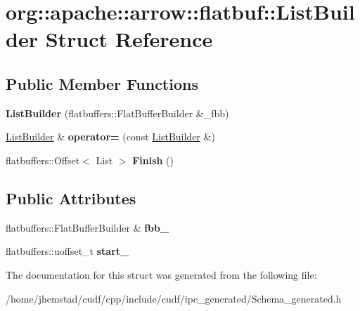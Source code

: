 \hypertarget{structorg_1_1apache_1_1arrow_1_1flatbuf_1_1ListBuilder}{}\section{org\+:\+:apache\+:\+:arrow\+:\+:flatbuf\+:\+:List\+Builder Struct Reference}
\label{structorg_1_1apache_1_1arrow_1_1flatbuf_1_1ListBuilder}
\subsection*{Public Member Functions}
\begin{DoxyCompactItemize}
\item 
{\bfseries List\+Builder} (flatbuffers\+::\+Flat\+Buffer\+Builder \&\+\_\+fbb)\hypertarget{structorg_1_1apache_1_1arrow_1_1flatbuf_1_1ListBuilder_a5aa3bbf4a737651d49a5c688754c3c94}{}\label{structorg_1_1apache_1_1arrow_1_1flatbuf_1_1ListBuilder_a5aa3bbf4a737651d49a5c688754c3c94}

\item 
\hyperlink{structorg_1_1apache_1_1arrow_1_1flatbuf_1_1ListBuilder}{List\+Builder} \& {\bfseries operator=} (const \hyperlink{structorg_1_1apache_1_1arrow_1_1flatbuf_1_1ListBuilder}{List\+Builder} \&)\hypertarget{structorg_1_1apache_1_1arrow_1_1flatbuf_1_1ListBuilder_acd18f75a87428486cea55e06c74a978c}{}\label{structorg_1_1apache_1_1arrow_1_1flatbuf_1_1ListBuilder_acd18f75a87428486cea55e06c74a978c}

\item 
flatbuffers\+::\+Offset$<$ List $>$ {\bfseries Finish} ()\hypertarget{structorg_1_1apache_1_1arrow_1_1flatbuf_1_1ListBuilder_ad236f7225ca8f8e629a3877b114d65dc}{}\label{structorg_1_1apache_1_1arrow_1_1flatbuf_1_1ListBuilder_ad236f7225ca8f8e629a3877b114d65dc}

\end{DoxyCompactItemize}
\subsection*{Public Attributes}
\begin{DoxyCompactItemize}
\item 
flatbuffers\+::\+Flat\+Buffer\+Builder \& {\bfseries fbb\+\_\+}\hypertarget{structorg_1_1apache_1_1arrow_1_1flatbuf_1_1ListBuilder_a095e609e78ae230e4e82b437c33bb6c3}{}\label{structorg_1_1apache_1_1arrow_1_1flatbuf_1_1ListBuilder_a095e609e78ae230e4e82b437c33bb6c3}

\item 
flatbuffers\+::uoffset\+\_\+t {\bfseries start\+\_\+}\hypertarget{structorg_1_1apache_1_1arrow_1_1flatbuf_1_1ListBuilder_a8c3b4d2bc3ecfb74b7bca97abcd66466}{}\label{structorg_1_1apache_1_1arrow_1_1flatbuf_1_1ListBuilder_a8c3b4d2bc3ecfb74b7bca97abcd66466}

\end{DoxyCompactItemize}


The documentation for this struct was generated from the following file\+:\begin{DoxyCompactItemize}
\item 
/home/jhemstad/cudf/cpp/include/cudf/ipc\+\_\+generated/Schema\+\_\+generated.\+h\end{DoxyCompactItemize}
